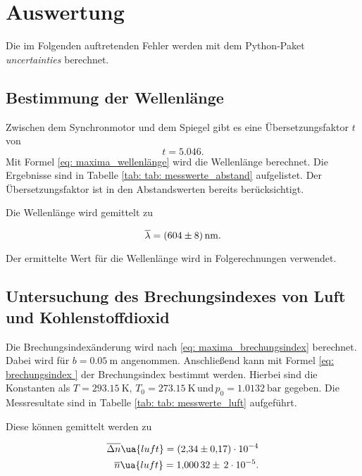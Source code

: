 \section{Auswertung}

Die im Folgenden auftretenden Fehler werden mit dem
Python-Paket \emph{uncertainties}\cite{uncertainties} berechnet.

\subsection{Bestimmung der Wellenlänge}
Zwischen dem Synchronmotor und dem Spiegel gibt es eine Übersetzungsfaktor $t$ von
\begin{equation*}
  t=5.046. %
\end{equation*}
Mit Formel \eqref{eq: maxima_wellenlänge} wird die Wellenlänge berechnet.
Die Ergebnisse sind in Tabelle \ref{tab: tab: messwerte_abstand} aufgelistet.
Der Übersetzungsfaktor ist in den Abstandswerten bereits berücksichtigt.



Die Wellenlänge wird gemittelt zu

\begin{equation}
  \label{eq:wellenlaenge}
  \overline{\lambda}=\SI{604\pm 8}{\nano\meter}.
\end{equation}

Der ermittelte Wert für die Wellenlänge wird in Folgerechnungen verwendet.

\subsection{Untersuchung des Brechungsindexes von Luft und Kohlenstoffdioxid}

Die Brechungsindexänderung wird nach \eqref{eq: maxima_brechungsindex} berechnet. Dabei wird
für $b=\SI{0.05}{\meter}$ angenommen. Anschließend kann mit Formel \eqref{eq: brechungsindex
} der Brechungsindex bestimmt werden. Hierbei sind die Konstanten als $T=\SI{293.15}{\kelvin},\, T_0=\SI{273.15}{\kelvin} \, %
\text{und} \, p_0=\SI{1.0132}{\bar}$ gegeben.
Die Messresultate sind in Tabelle \ref{tab: tab: messwerte_luft} aufgeführt.

Diese können gemittelt werden zu

\begin{align}
  \label{eq:mittelwerte_luft}
  \begin{aligned}
    \overline{\Delta n}\ua{luft}=\num{2.34\pm 0.17 e-4}\\
    \overline{n}\ua{luft}=\num{1.00032}\pm\, \num{2e-5}.
  \end{aligned}
\end{align}

